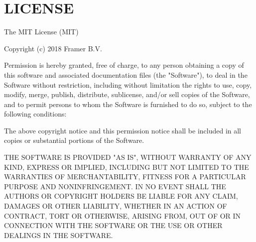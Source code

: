 \chapter{LICENSE}
\hypertarget{md_node__modules_2framer-motion_2_l_i_c_e_n_s_e}{}\label{md_node__modules_2framer-motion_2_l_i_c_e_n_s_e}
The MIT License (MIT)

Copyright (c) 2018 Framer B.\+V.

Permission is hereby granted, free of charge, to any person obtaining a copy of this software and associated documentation files (the "{}\+Software"{}), to deal in the Software without restriction, including without limitation the rights to use, copy, modify, merge, publish, distribute, sublicense, and/or sell copies of the Software, and to permit persons to whom the Software is furnished to do so, subject to the following conditions\+:

The above copyright notice and this permission notice shall be included in all copies or substantial portions of the Software.

THE SOFTWARE IS PROVIDED "{}\+AS IS"{}, WITHOUT WARRANTY OF ANY KIND, EXPRESS OR IMPLIED, INCLUDING BUT NOT LIMITED TO THE WARRANTIES OF MERCHANTABILITY, FITNESS FOR A PARTICULAR PURPOSE AND NONINFRINGEMENT. IN NO EVENT SHALL THE AUTHORS OR COPYRIGHT HOLDERS BE LIABLE FOR ANY CLAIM, DAMAGES OR OTHER LIABILITY, WHETHER IN AN ACTION OF CONTRACT, TORT OR OTHERWISE, ARISING FROM, OUT OF OR IN CONNECTION WITH THE SOFTWARE OR THE USE OR OTHER DEALINGS IN THE SOFTWARE. 